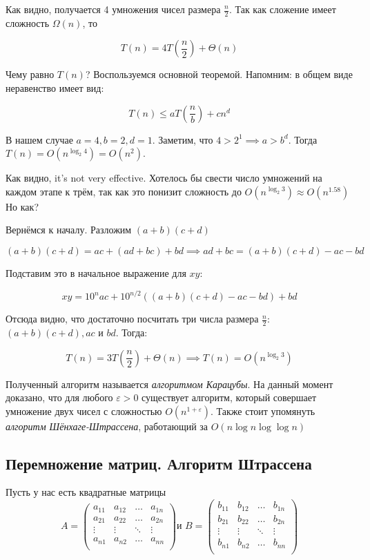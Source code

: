 Как видно, получается 4 умножения чисел размера \(\frac{n}{2}\). Так как сложение имеет сложность \(\Omega(n)\), то

\[T(n) = 4T\left( \frac{n}{2} \right) + \Theta(n)\]

Чему равно \(T(n)\)? Воспользуемся основной теоремой. Напомним: в общем виде неравенство
имеет вид:

\[T(n) \leqslant aT\left( \frac{n}{b} \right) + cn^d\]

В нашем случае \(a = 4, b = 2, d = 1\). Заметим, что \(4 > 2^1 \implies a > b^d\). Тогда \(T(n) = O(n^{\log_2 4}) = O(n^2)\).

Как видно, it’s not very effective. Хотелось бы свести число умножений на каждом этапе к
трём, так как это понизит сложность до \(O(n^{\log_2 3}) \approx O(n^{1.58})\)Но как?

Вернёмся к началу. Разложим \((a + b)(c + d)\)

\[(a+b)(c+d) = ac+(ad+bc) + bd \implies ad + bc = (a + b)(c + d) - ac - bd\]

Подставим это в начальное выражение для \(xy\):

\[xy = 10^{n}ac + 10^{n/2}((a + b)(c + d) - ac - bd)+bd\]

Отсюда видно, что достаточно посчитать три числа размера \(\frac{n}{2}\): \((a + b)(c + d), ac\) и \(bd\). Тогда:

\[T(n) = 3T\left( \frac{n}{2} \right) + \Theta(n) \implies T(n) = O(n^{\log_2 3})\]

Полученный алгоритм называется \emph{алгоритмом Карацубы}.
На данный момент доказано, что для любого $\varepsilon > 0$ существует алгоритм, который совершает умножение двух чисел с сложностью \(O(n^{1 + \varepsilon})\). Также стоит упомянуть \emph{алгоритм Шёнхаге-Штрассена}, работающий за \(O(n \log n \log \log n)\)

\subsection{Перемножение матриц. Алгоритм Штрассена}

Пусть у нас есть квадратные матрицы
\[A = \begin{pmatrix}
a_{11} & a_{12} & \ldots & a_{1n} \\
a_{21} & a_{22} & \ldots & a_{2n} \\
\vdots & \vdots & \ddots & \vdots \\
a_{n1} & a_{n2} & \ldots & a_{nn} \\
\end{pmatrix}
\text{и } 
B = \begin{pmatrix}
b_{11} & b_{12} & \ldots & b_{1n} \\
b_{21} & b_{22} & \ldots & b_{2n} \\
\vdots & \vdots & \ddots & \vdots \\
b_{n1} & b_{n2} & \ldots & b_{nn} \\
\end{pmatrix}\]

